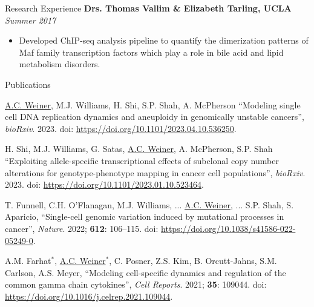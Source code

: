 \documentclass{resume} %
\begin{document}
\begin{rSection}{Research Experience}
{\bf Drs. Thomas Vallim \& Elizabeth Tarling, UCLA} \hfill {\em Summer 2017}
\begin{itemize}
  \item Developed ChIP-seq analysis pipeline to quantify the dimerization patterns of Maf family transcription factors which play a role in bile acid and lipid metabolism disorders.
\end{itemize}

\end{rSection}

\begin{rSection}{Publications}

\underline{A.C. Weiner}, M.J. Williams, H. Shi, S.P. Shah, A. McPherson ``Modeling single cell DNA replication dynamics and aneuploidy in genomically unstable cancers'', \textit{bioRxiv}. 2023. doi: \url{https://doi.org/10.1101/2023.04.10.536250}.

H. Shi, M.J. Williams, G. Satas, \underline{A.C. Weiner}, A. McPherson, S.P. Shah ``Exploiting allele-specific transcriptional effects of subclonal copy number alterations for genotype-phenotype mapping in cancer cell populations'', \textit{bioRxiv}. 2023. doi: \url{https://doi.org/10.1101/2023.01.10.523464}.

T. Funnell, C.H. O’Flanagan, M.J. Williams, ... \underline{A.C. Weiner}, ... S.P. Shah, S. Aparicio, ``Single-cell genomic variation induced by mutational processes in cancer'', \textit{Nature}. 2022; \textbf{612}: 106–115. doi: \url{https://doi.org/10.1038/s41586-022-05249-0}.


A.M. Farhat$^{\ast}$, \underline{A.C. Weiner}$^{\ast}$, C. Posner, Z.S. Kim, B. Orcutt-Jahns, S.M. Carlson, A.S. Meyer, ``Modeling cell-specific dynamics and regulation of the common gamma chain cytokines'', \textit{Cell Reports}. 2021; \textbf{35}: 109044. doi: \url{https://doi.org/10.1016/j.celrep.2021.109044}.


\end{rSection}

\end{document}
